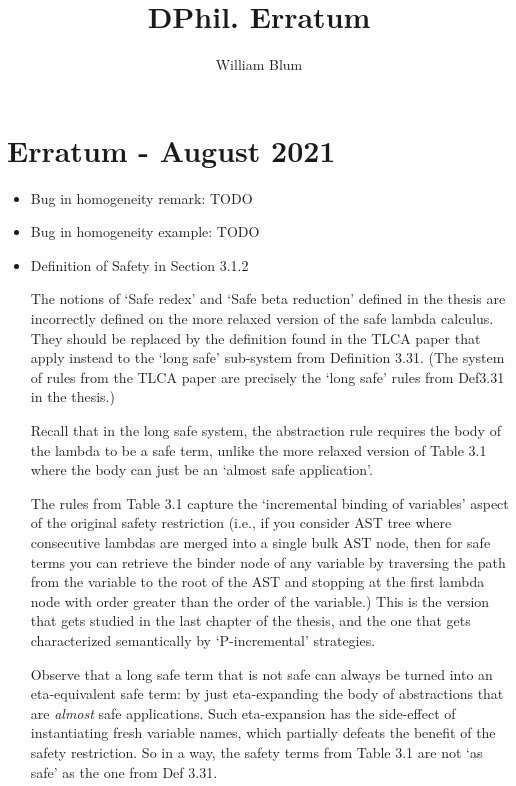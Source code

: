 \documentclass[11pt]{article}
\begin{document}
\title{DPhil. Erratum}
\author{William Blum}

\maketitle

\section {Erratum - August 2021}

\begin{itemize}
\item Bug in homogeneity remark: TODO
\item Bug in homogeneity example: TODO

\item Definition of Safety in Section 3.1.2

The notions of `Safe redex' and `Safe beta reduction' defined in the thesis are incorrectly defined on
the more relaxed version of the safe lambda calculus. They should be replaced by the definition found in the TLCA paper 
that apply instead to the `long safe' sub-system from Definition 3.31.
(The system of rules from the TLCA paper are precisely the `long safe' rules from Def3.31 in the thesis.)

Recall that in the long safe system, the abstraction rule requires the body of the lambda to be a safe term, 
unlike the more relaxed version of Table 3.1 where the body can just be an `almost safe application'.

The rules from Table 3.1 capture the `incremental binding of variables' aspect of the original safety restriction (i.e., if you consider AST tree
where consecutive lambdas are merged into a single bulk AST node, then for safe terms you can retrieve the binder node of any variable by traversing the path from 
the variable to the root of the AST and stopping at the first lambda node with order greater than the order of the variable.)
This is the version that gets studied in the last chapter of the thesis, and 
the one that gets characterized semantically by `P-incremental' strategies.

Observe that a long safe term that is not safe can always be turned into an eta-equivalent safe term: by just eta-expanding 
the body of abstractions that are \emph{almost} safe applications. Such eta-expansion has the side-effect
 of instantiating fresh variable names, which partially defeats the benefit of the safety restriction. 
 So in a way, the safety terms from Table 3.1 are not `as safe' as the one from Def 3.31.
 

\end{itemize}
\end{document}

